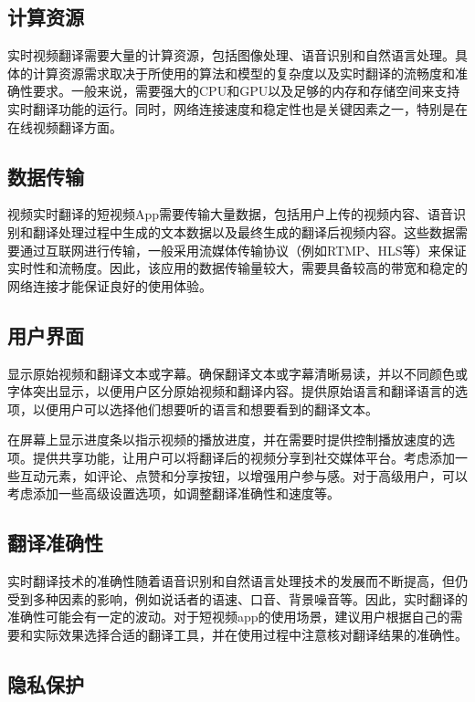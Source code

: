     \subsection{计算资源}
    
    实时视频翻译需要大量的计算资源，包括图像处理、语音识别和自然语言处理。具体的计算资源需求取决于所使用的算法和模型的复杂度以及实时翻译的流畅度和准确性要求。一般来说，需要强大的CPU和GPU以及足够的内存和存储空间来支持实时翻译功能的运行。同时，网络连接速度和稳定性也是关键因素之一，特别是在在线视频翻译方面。
    
    \subsection{数据传输}
    
    视频实时翻译的短视频App需要传输大量数据，包括用户上传的视频内容、语音识别和翻译处理过程中生成的文本数据以及最终生成的翻译后视频内容。这些数据需要通过互联网进行传输，一般采用流媒体传输协议（例如RTMP、HLS等）来保证实时性和流畅度。因此，该应用的数据传输量较大，需要具备较高的带宽和稳定的网络连接才能保证良好的使用体验。
    
    
    \subsection{用户界面}
    
    显示原始视频和翻译文本或字幕。确保翻译文本或字幕清晰易读，并以不同颜色或字体突出显示，以便用户区分原始视频和翻译内容。提供原始语言和翻译语言的选项，以便用户可以选择他们想要听的语言和想要看到的翻译文本。
    
    在屏幕上显示进度条以指示视频的播放进度，并在需要时提供控制播放速度的选项。提供共享功能，让用户可以将翻译后的视频分享到社交媒体平台。考虑添加一些互动元素，如评论、点赞和分享按钮，以增强用户参与感。对于高级用户，可以考虑添加一些高级设置选项，如调整翻译准确性和速度等。
    
    
    \subsection{翻译准确性}
    
    实时翻译技术的准确性随着语音识别和自然语言处理技术的发展而不断提高，但仍受到多种因素的影响，例如说话者的语速、口音、背景噪音等。因此，实时翻译的准确性可能会有一定的波动。对于短视频app的使用场景，建议用户根据自己的需要和实际效果选择合适的翻译工具，并在使用过程中注意核对翻译结果的准确性。
    
    
    \subsection{隐私保护}

